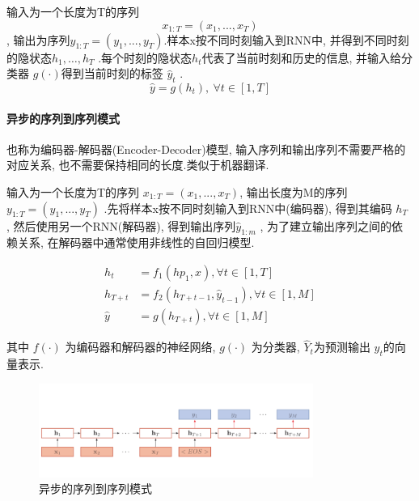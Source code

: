 \documentclass[a4paper]{article}
\begin{document}
输入为一个长度为T的序列$$ x_{1:T}=(x_1, ...,  x_T)$$, 输出为序列$y_{1:T}=(y_1, ...,  y_T)$.样本x按不同时刻输入到RNN中, 并得到不同时刻的隐状态$h_1,  \dots,  h_T$ .每个时刻的隐状态$h_t$代表了当前时刻和历史的信息, 并输入给分类器 $g(\cdot)$得到当前时刻的标签 $ \hat{y}_t$ .
$$\hat{y}= g(h_t),  \  \forall t \in [1, T]$$



\paragraph{异步的序列到序列模式}
也称为编码器-解码器(Encoder-Decoder)模型, 输入序列和输出序列不需要严格的对应关系, 也不需要保持相同的长度.类似于机器翻译.

输入为一个长度为T的序列 $ x_{1:T}=(x_1, ...,  x_T)$, 输出长度为M的序列 $ y_{1:T}=(y_1, ...,  y_T)$ .先将样本x按不同时刻输入到RNN中(编码器), 得到其编码 $h_T$ , 然后使用另一个RNN(解码器), 得到输出序列$ \hat{y}_{1:m}$ , 为了建立输出序列之间的依赖关系, 在解码器中通常使用非线性的自回归模型.

\begin{equation}
    \begin{split}
        h_t &= f_1(hp_1, x),   \forall t \in [1, T] \\
    h_{T+t}& = f_2(h_{T+t-1}, \hat{y}_{t-1}),  \forall t\in[1, M]\\
    \hat{y}&= g(h_{T+t}),   \forall t\in[1, M]
    \end{split} 
\end{equation}

其中 $f(\cdot)$ 为编码器和解码器的神经网络,  $g(\cdot)$ 为分类器,  $\hat{Y}_t$为预测输出 $\hat{y}_t$的向量表示.
\begin{figure}[!htb]
    \center
\includegraphics[width=0.8\textwidth]{RNN_model3.png}
\caption{异步的序列到序列模式}
\end{figure}


\end{document}
